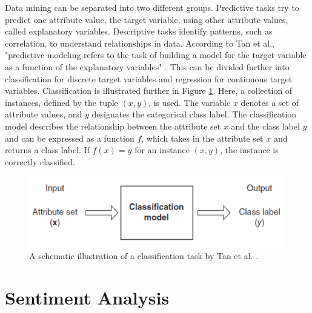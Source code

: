 Data mining can be separated into two different groups. Predictive tasks try to predict one attribute value, the target variable, using other attribute values, called explanatory variables. Descriptive tasks identify patterns, such as correlation, to understand relationships in data. According to Tan et al., "predictive modeling refers to the task of building a model for the target variable as a function of the explanatory variables" \cite[p.~29]{DBLP:books/aw/TanSKK2019}. This can be divided further into classification for discrete target variables and regression for continuous target variables. Classification is illustrated further in Figure \ref{fig:classifiation}. Here, a collection of instances, defined by the tuple $(x,y)$, is used. The variable $x$ denotes a set of attribute values, and $y$ designates the categorical class label. The classification model describes the relationship between the attribute set $x$ and the class label $y$ and can be expressed as a function $f$, which takes in the attribute set $x$ and returns a class label. If $f(x) = y$ for an instance $(x,y)$, the instance is correctly classified.
\begin{figure}
    \centering
    \includegraphics[scale = 0.6]{Images/classification.png}
    \caption{A schematic illustration of a classification task by Tan et al. \cite[p.~134]{DBLP:books/aw/TanSKK2019}.}
    \label{fig:classifiation}
\end{figure}



\section{Sentiment Analysis}


